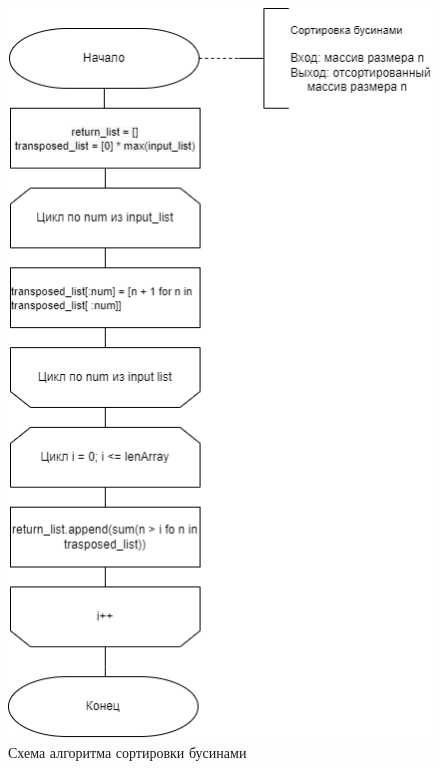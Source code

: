 \begin{figure}[H]
	\begin{center}
		\includegraphics[scale=0.5]{img/bead_sort.png}
	\end{center}
	\captionsetup{justification=centering}
	\caption{Схема алгоритма сортировки бусинами}
	\label{img:bead_sort}
\end{figure}

\newpage

